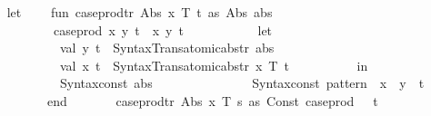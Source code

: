 \begin{isabellebody}
\isamarkupfalse%
\ {\isacartoucheopen}\isanewline
\ \ let\isanewline
\ \ \ \ fun\ case{\isacharunderscore}{\kern0pt}prod{\isacharunderscore}{\kern0pt}tr{\isacharprime}{\kern0pt}\ {\isacharbrackleft}{\kern0pt}Abs\ {\isacharparenleft}{\kern0pt}x{\isacharcomma}{\kern0pt}\ T{\isacharcomma}{\kern0pt}\ t\ as\ {\isacharparenleft}{\kern0pt}Abs\ abs{\isacharparenright}{\kern0pt}{\isacharparenright}{\kern0pt}{\isacharbrackright}{\kern0pt}\ {\isacharequal}{\kern0pt}\isanewline
\ \ \ \ \ \ \ \ \ \ {\isacharparenleft}{\kern0pt}{\isacharasterisk}{\kern0pt}\ case{\isacharunderscore}{\kern0pt}prod\ {\isacharparenleft}{\kern0pt}{\isasymlambda}x\ y{\isachardot}{\kern0pt}\ t{\isacharparenright}{\kern0pt}\ {\isasymRightarrow}\ {\isasymlambda}{\isacharparenleft}{\kern0pt}x{\isacharcomma}{\kern0pt}\ y{\isacharparenright}{\kern0pt}\ t\ {\isacharasterisk}{\kern0pt}{\isacharparenright}{\kern0pt}\isanewline
\ \ \ \ \ \ \ \ \ \ let\isanewline
\ \ \ \ \ \ \ \ \ \ \ \ val\ {\isacharparenleft}{\kern0pt}y{\isacharcomma}{\kern0pt}\ t{\isacharprime}{\kern0pt}{\isacharparenright}{\kern0pt}\ {\isacharequal}{\kern0pt}\ Syntax{\isacharunderscore}{\kern0pt}Trans{\isachardot}{\kern0pt}atomic{\isacharunderscore}{\kern0pt}abs{\isacharunderscore}{\kern0pt}tr{\isacharprime}{\kern0pt}\ abs{\isacharsemicolon}{\kern0pt}\isanewline
\ \ \ \ \ \ \ \ \ \ \ \ val\ {\isacharparenleft}{\kern0pt}x{\isacharprime}{\kern0pt}{\isacharcomma}{\kern0pt}\ t{\isacharprime}{\kern0pt}{\isacharprime}{\kern0pt}{\isacharparenright}{\kern0pt}\ {\isacharequal}{\kern0pt}\ Syntax{\isacharunderscore}{\kern0pt}Trans{\isachardot}{\kern0pt}atomic{\isacharunderscore}{\kern0pt}abs{\isacharunderscore}{\kern0pt}tr{\isacharprime}{\kern0pt}\ {\isacharparenleft}{\kern0pt}x{\isacharcomma}{\kern0pt}\ T{\isacharcomma}{\kern0pt}\ t{\isacharprime}{\kern0pt}{\isacharparenright}{\kern0pt}{\isacharsemicolon}{\kern0pt}\isanewline
\ \ \ \ \ \ \ \ \ \ in\isanewline
\ \ \ \ \ \ \ \ \ \ \ \ Syntax{\isachardot}{\kern0pt}const\ \isactrlsyntaxUNDERSCOREconst {\isasymopen}{\isacharunderscore}{\kern0pt}abs{\isasymclose}\ {\isachardollar}{\kern0pt}\isanewline
\ \ \ \ \ \ \ \ \ \ \ \ \ \ {\isacharparenleft}{\kern0pt}Syntax{\isachardot}{\kern0pt}const\ \isactrlsyntaxUNDERSCOREconst {\isasymopen}{\isacharunderscore}{\kern0pt}pattern{\isasymclose}\ {\isachardollar}{\kern0pt}\ x{\isacharprime}{\kern0pt}\ {\isachardollar}{\kern0pt}\ y{\isacharparenright}{\kern0pt}\ {\isachardollar}{\kern0pt}\ t{\isacharprime}{\kern0pt}{\isacharprime}{\kern0pt}\isanewline
\ \ \ \ \ \ \ \ \ \ end\isanewline
\ \ \ \ \ \ {\isacharbar}{\kern0pt}\ case{\isacharunderscore}{\kern0pt}prod{\isacharunderscore}{\kern0pt}tr{\isacharprime}{\kern0pt}\ {\isacharbrackleft}{\kern0pt}Abs\ {\isacharparenleft}{\kern0pt}x{\isacharcomma}{\kern0pt}\ T{\isacharcomma}{\kern0pt}\ {\isacharparenleft}{\kern0pt}s\ as\ Const\ {\isacharparenleft}{\kern0pt}\isactrlconstUNDERSCOREsyntax {\isasymopen}case{\isacharunderscore}{\kern0pt}prod{\isasymclose}{\isacharcomma}{\kern0pt}\ {\isacharunderscore}{\kern0pt}{\isacharparenright}{\kern0pt}\ {\isachardollar}{\kern0pt}\ t{\isacharparenright}{\kern0pt}{\isacharparenright}{\kern0pt}{\isacharbrackright}{\kern0pt}\ {\isacharequal}{\kern0pt}\isanewline

\end{isabellebody}
